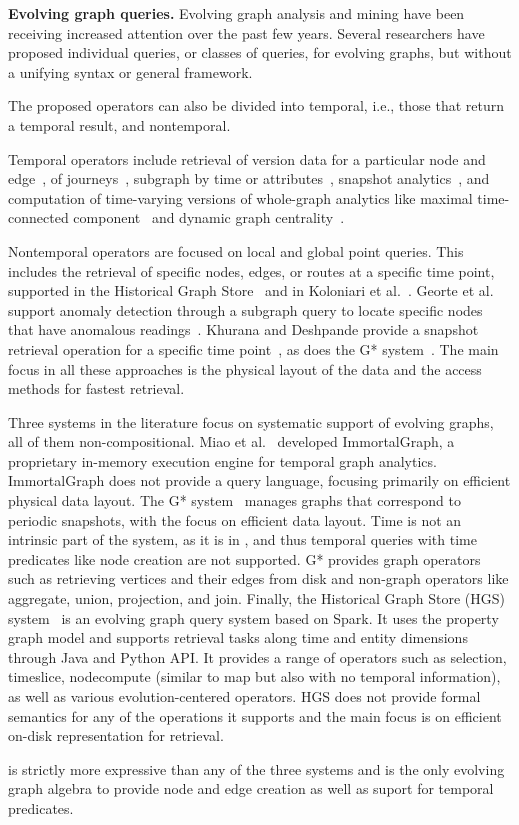 {\bf Evolving graph queries.}  Evolving graph analysis and mining have
been receiving increased attention over the past few years.  Several
researchers have proposed individual queries, or classes of queries,
for evolving graphs, but without a unifying syntax or general
framework.

The proposed operators can also be divided into temporal, i.e., those
that return a temporal result, and nontemporal.

Temporal operators include retrieval of version data for a particular
node and edge~\cite{Khurana2016}, of
journeys~\cite{Casteigts2011,George2009}, subgraph by time or
attributes~\cite{Huo2014,Khurana2016}, snapshot
analytics~\cite{Khurana2016,Labouseur2015,Miao2015}, and computation
of time-varying versions of whole-graph analytics like maximal
time-connected component~\cite{Ferreira2004} and dynamic graph
centrality~\cite{Lerman2010}.

Nontemporal operators are focused on local and global point queries.
This includes the retrieval of specific nodes, edges, or routes at a
specific time point, supported in the Historical Graph
Store~\cite{Khurana2016} and in Koloniari et al.~\cite{Koloniari2012}.
Georte et al. support anomaly detection through a subgraph query to
locate specific nodes that have anomalous readings~\cite{George2009}.
Khurana and Deshpande provide a snapshot retrieval operation for a
specific time point~\cite{Khurana2013}, as does the G*
system~\cite{Labouseur2015}.  The main focus in all these approaches
is the physical layout of the data and the access methods for fastest
retrieval.


Three systems in the literature focus on systematic support of
evolving graphs, all of them non-compositional.  Miao et
al.~\cite{Miao2015} developed ImmortalGraph, a proprietary in-memory
execution engine for temporal graph analytics.  ImmortalGraph does not
provide a query language, focusing primarily on efficient physical
data layout.  The G* system~\cite{Labouseur2015} manages graphs that
correspond to periodic snapshots, with the focus on efficient data
layout.  Time is not an intrinsic part of the system, as it is in
\tga, and thus temporal queries with time predicates like node
creation are not supported.  G* provides graph operators such as
retrieving vertices and their edges from disk and non-graph operators
like aggregate, union, projection, and join.  Finally, the Historical
Graph Store (HGS) system~\cite{Khurana2016} is an evolving graph query
system based on Spark.  It uses the property graph model and supports
retrieval tasks along time and entity dimensions through Java and
Python API.  It provides a range of operators such as selection,
timeslice, nodecompute (similar to map but also with no temporal
information), as well as various evolution-centered operators.  HGS
does not provide formal semantics for any of the operations it
supports and the main focus is on efficient on-disk representation for
retrieval.

\tga is strictly more expressive than any of the three systems and is
the only evolving graph algebra to provide node and edge creation as
well as suport for temporal predicates.
